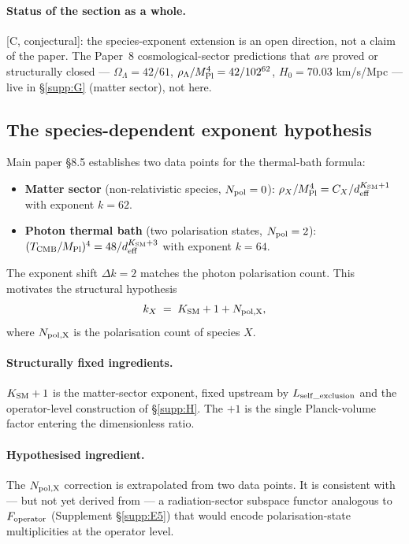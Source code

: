 \documentclass[11pt]{article}
\theoremstyle{plain}
\theoremstyle{definition}
\theoremstyle{remark}
\newcommand{\Mpl}{M_{\rm Pl}}
\begin{document}
\paragraph{Status of the section as a whole.}  [C, conjectural]: the species-exponent extension is an open direction, not a claim of the paper.  The Paper~8 cosmological-sector predictions that \emph{are} proved or structurally closed --- $\Omega_\Lambda = 42/61$, $\rho_\Lambda/\Mpl^4 = 42/102^{62}$, $H_0 = 70.03$ km/s/Mpc --- live in \S\ref{supp:G} (matter sector), not here.

\bigskip

\subsection{The species-dependent exponent hypothesis}\label{supp:J1}

Main paper \S8.5 establishes two data points for the thermal-bath formula:

\begin{itemize}[leftmargin=2em,itemsep=3pt]
  \item \textbf{Matter sector} (non-relativistic species, $N_{\rm pol} = 0$): $\rho_X / \Mpl^4 = C_X / d_{\rm eff}^{K_{\rm SM} + 1}$ with exponent $k = 62$.
  \item \textbf{Photon thermal bath} (two polarisation states, $N_{\rm pol} = 2$): $(T_{\rm CMB} / \Mpl)^4 = 48 / d_{\rm eff}^{K_{\rm SM} + 3}$ with exponent $k = 64$.
\end{itemize}

The exponent shift $\Delta k = 2$ matches the photon polarisation count.  This motivates the structural hypothesis
\[
  k_X \;=\; K_{\rm SM} + 1 + N_{\rm pol,X},
\]
where $N_{\rm pol,X}$ is the polarisation count of species $X$.

\paragraph{Structurally fixed ingredients.}  $K_{\rm SM} + 1$ is the matter-sector exponent, fixed upstream by $L_{\rm self\_exclusion}$ and the operator-level construction of \S\ref{supp:H}.  The $+1$ is the single Planck-volume factor entering the dimensionless ratio.

\paragraph{Hypothesised ingredient.}  The $N_{\rm pol,X}$ correction is extrapolated from two data points.  It is consistent with --- but not yet derived from --- a radiation-sector subspace functor analogous to $F_{\rm operator}$ (Supplement \S\ref{supp:E5}) that would encode polarisation-state multiplicities at the operator level.
\end{document}
